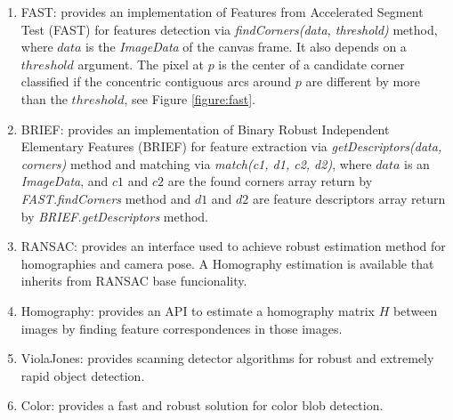 \begin{enumerate}
  \item FAST: provides an implementation of Features from Accelerated Segment Test (FAST) \cite{Rosten2010} for features detection via \textit{findCorners(data, threshold)} method, where $data$ is the \textit{ImageData} of the canvas \cite{Canvas2013} frame. It also depends on a $threshold$ argument. The pixel at $p$ is the center of a candidate corner classified if the concentric contiguous arcs around $p$ are different by more than the $threshold$, see Figure \ref{figure:fast}.

  \item BRIEF: provides an implementation of Binary Robust Independent Elementary Features (BRIEF) \cite{Calonder2010} for feature extraction via \textit{getDescriptors(data, corners)} method and matching via \textit{match(c1, d1, c2, d2)}, where $data$ is an \textit{ImageData}, and $c1$ and $c2$ are the found corners array return by \textit{FAST.findCorners} method and $d1$ and $d2$ are feature descriptors array return by \textit{BRIEF.getDescriptors} method.
  \item RANSAC: provides an interface used to achieve robust estimation method for homographies and camera pose. A Homography estimation is available that inherits from RANSAC \cite{Hartley2004} base funcionality.
  \item Homography: provides an API to estimate a homography matrix $H$ between images by finding feature correspondences in those images.
  \item ViolaJones: provides scanning detector algorithms for robust and extremely rapid object detection.
  \item Color: provides a fast and robust solution for color blob detection.
\end{enumerate}

